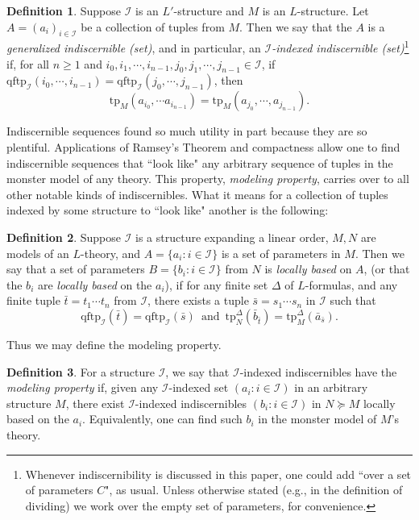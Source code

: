 \documentclass{article}
\newcommand{\calI}{\mathcal{I}}
\newcommand{\tp}{\text{tp}}
\newcommand{\qftp}{\text{qftp}}
\theoremstyle{definition}
\newtheorem{definition}{Definition}
\theoremstyle{definition}
\theoremstyle{definition}
\theoremstyle{definition}
\begin{document}
\begin{definition}{}\label{generalized indiscernibles}
Suppose $\calI$ is an $L'$-structure and $M$ is an $L$-structure. Let $A=(a_i)_{i\in \calI}$ be a collection of tuples from $M$. Then we say that the $A$ is a \textit{generalized indiscernible (set)}, and in particular, an $\calI$\textit{-indexed indiscernible (set)}\footnote{Whenever indiscernibility is discussed in this paper, one could add ``over a set of parameters $C$", as usual. Unless otherwise stated (e.g., in the definition of dividing) we work over the empty set of parameters, for convenience.} if, for all $n\geq 1$ and $i_0,i_1,\dotsm, i_{n-1},j_0,j_1,\dotsm, j_{n-1}\in \calI$, if $\qftp_\calI(i_0,\dotsm, i_{n-1})=\qftp_\calI(j_0,\dotsm, j_{n-1})$, then $$\tp_M(a_{i_0},\dotsm a_{i_{n-1}})=\tp_M(a_{j_0},\dotsm, a_{j_{n-1}}).$$
\end{definition}

Indiscernible sequences found so much utility in part because they are so plentiful. Applications of Ramsey's Theorem and compactness allow one to find indiscernible sequences that ``look like" any arbitrary sequence of tuples in the monster model of any theory. This property, \textit{modeling property}, carries over to all other notable kinds of indiscernibles. What it means for a collection of tuples indexed by some structure to ``look like" another is the following:


\begin{definition}
    Suppose $\calI$ is a structure expanding a linear order, $M,N$ are models of an $L$-theory, and $A=\{a_i\colon i\in \calI\}$ is a set of parameters in $M$. Then we say that a set of parameters $B=\{b_i\colon i\in \calI\}$ from $N$ is \textit{locally based} on $A$, (or that the $b_i$ are \textit{locally based} on the $a_i$), if for any finite set $\Delta$ of $L$-formulas, and any finite tuple $\bar{t}=t_1\dotsm t_n$ from $\calI$, there exists a tuple $\bar{s}=s_1\dotsm s_n$ in $\calI$ such that \[\qftp_\calI(\bar{t})=\qftp_\calI(\bar{s})\enspace \text{and}\enspace \tp_N^\Delta(\bar{b}_{\bar{t}})=\tp_M^\Delta(\bar{a}_{\bar{s}}).\]
\end{definition}

Thus we may define the modeling property.

\begin{definition}{}
For a structure $\calI$, we say that $\calI$-indexed indiscernibles have the \textit{modeling property} if, given any $\calI$-indexed set $(a_i\colon i\in\calI)$ in an arbitrary structure $M$, there exist $\calI$-indexed indiscernibles $(b_i\colon i\in\calI)$ in $N\succeq M$ locally based on the $a_i$. Equivalently, one can find such $b_i$ in the monster model of $M$'s theory.

\end{definition}
\end{document}
